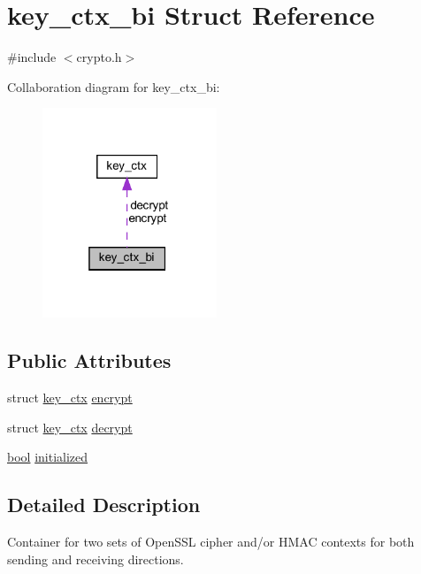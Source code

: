 \hypertarget{structkey__ctx__bi}{}\section{key\+\_\+ctx\+\_\+bi Struct Reference}
\label{structkey__ctx__bi}


{\ttfamily \#include $<$crypto.\+h$>$}



Collaboration diagram for key\+\_\+ctx\+\_\+bi\+:
\nopagebreak
\begin{figure}[H]
\begin{center}
\leavevmode
\includegraphics[width=148pt]{structkey__ctx__bi__coll__graph}
\end{center}
\end{figure}
\subsection*{Public Attributes}
\begin{DoxyCompactItemize}
\item 
struct \hyperlink{structkey__ctx}{key\+\_\+ctx} \hyperlink{structkey__ctx__bi_a7ef99b43dc7528037f1c81685d24a4d6}{encrypt}
\item 
struct \hyperlink{structkey__ctx}{key\+\_\+ctx} \hyperlink{structkey__ctx__bi_a552f7a501cae9ddf3a107d87a1b039fa}{decrypt}
\item 
\hyperlink{automatic_8c_abb452686968e48b67397da5f97445f5b}{bool} \hyperlink{structkey__ctx__bi_a2d1c4992f06672c3474722a569fb23b8}{initialized}
\end{DoxyCompactItemize}


\subsection{Detailed Description}
Container for two sets of Open\+S\+S\+L cipher and/or H\+M\+A\+C contexts for both sending and receiving directions. 

